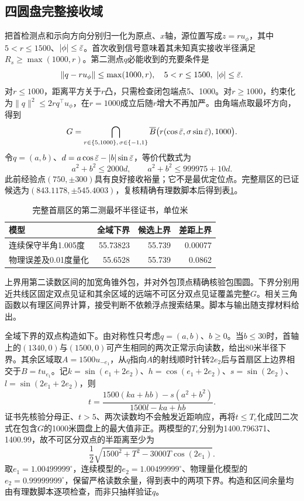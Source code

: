 \documentclass[UTF8,a4paper,zihao=-4,fontset=fandol]{ctexart}
\begin{document}
\subsection{四圆盘完整接收域}
把首检测点和示向方向分别归一化为原点、$x$轴，源位置写成$z=ru_\phi$，其中$5<r\le1500$、$|\phi|\le\bar\varepsilon$。首次收到信号意味着其未知真实接收半径满足$R_s\ge\max(1000,r)$。第二测点$q$必能收到的充要条件是
\begin{equation}\|q-ru_\phi\|\le\max(1000,r),\quad 5<r\le1500,\ |\phi|\le\bar\varepsilon.\end{equation}
对$r\le1000$，距离平方关于$r$凸，只需检查闭包端点5、1000。对$r\ge1000$，约束化为$\|q\|^2\le2r q^\top u_\phi$，在$r=1000$成立后随$r$增大不再加严。由角端点取最坏方向，得到
\begin{equation}\label{eq:G}
G=\bigcap_{r\in\{5,1000\},\,\sigma\in\{-1,1\}}\overline B\big(r(\cos\bar\varepsilon,\sigma\sin\bar\varepsilon),1000\big).
\end{equation}
令$q=(a,b)$、$d=a\cos\bar\varepsilon-|b|\sin\bar\varepsilon$，等价代数式为
\begin{equation}a^2+b^2\le2000d,\qquad a^2+b^2\le999975+10d.\end{equation}
此前经验点$(750,\pm300)$具有良好接收裕量；它不是最优定位点。完整扇区的已证候选为$(843.1178,\pm545.4003)$，复核精确有理数脚本后得到表\ref{tab:q2}。
\begin{table}[!htbp]\centering\caption{完整首扇区的第二测最坏半径证书，单位米}\label{tab:q2}
\begin{tabular}{lrrr}\toprule 模型&全域下界&候选上界&差距上界\\\midrule
连续保守半角1.005度&55.73823&55.739&0.00077\\
物理误差及0.01度量化&55.6528&55.739&0.0862\\\bottomrule\end{tabular}\end{table}
上界用第二读数区间的加宽角锥外包，并对外包顶点精确核验包围圆。下界分别用近共线区固定双点见证和其余区域的远端不可区分双点见证覆盖完整$G$。相关三角函数以有理区间界计算，接受判断不依赖浮点搜索结果。脚本与输出随支撑材料给出。

全域下界的双点构造如下。由对称性只考虑$q=(a,b)$、$b\ge0$。当$b\le30$时，首轴上的$(1340,0)$与$(1500,0)$可产生相同的两次正常示向读数，给出80米半径下界。其余区域取$A=1500u_{-e_1}$，从$q$指向$A$的射线顺时针转$2e_2$后与首扇区上边界相交于$B=t u_{e_1}$。记$k=\sin(e_1+2e_2)$、$h=\cos(e_1+2e_2)$、$s=\sin(2e_2)$、$l=\sin(2e_1+2e_2)$，则
\begin{equation}
t=\frac{1500(ka+hb)-s(a^2+b^2)}{1500l-ka+hb}.
\end{equation}
证书先核验分母正、$t>5$、两次读数均不会触发近距响应，再将$t\le T_e$化成凹二次式在包含$G$的1000米圆盘上的最大值非正。两模型的$T_e$分别为1400.796371、1400.99，故不可区分双点的半距离至少为
\begin{equation}
\frac12\sqrt{1500^2+T^2-3000T\cos(2e_1)}.
\end{equation}
取$e_1=1.00499999^\circ$，连续模型的$e_2=1.00499999^\circ$、物理量化模型的$e_2=0.99999999^\circ$，保留严格读数余量，得到表中的两项下界。构造和区间余量均由有理数脚本逐项检查，而非只抽样验证$q$。
\end{document}
